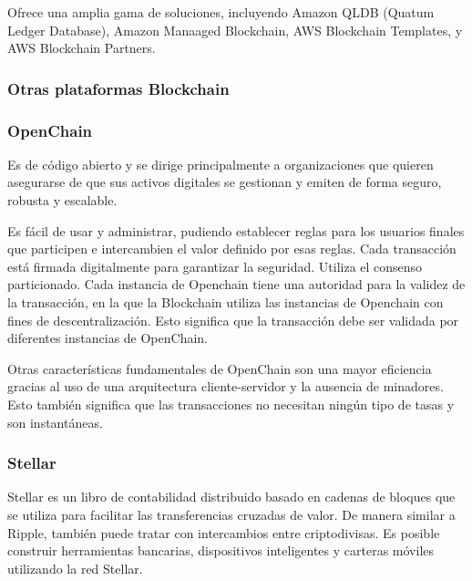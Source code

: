 \vspace{5mm}

\noindent Ofrece una amplia gama de soluciones, incluyendo Amazon QLDB (Quatum Ledger Database), Amazon Manaaged 
Blockchain, AWS Blockchain Templates, y AWS Blockchain Partners.

\subsubsection{Otras plataformas Blockchain}

\subsubsection*{OpenChain}

Es de código abierto y se dirige principalmente a organizaciones que quieren asegurarse de que sus activos digitales
se gestionan y emiten de forma seguro, robusta y escalable.

\vspace{5mm}

\noindent Es fácil de usar y administrar, pudiendo establecer reglas para los usuarios finales que participen e 
intercambien el valor definido por esas reglas. Cada transacción está firmada digitalmente para garantizar la 
seguridad. Utiliza el consenso particionado. Cada instancia de Openchain tiene una autoridad para la validez de 
la transacción, en la que la Blockchain utiliza las instancias de Openchain con fines de descentralización. Esto 
significa que la transacción debe ser validada por diferentes instancias de OpenChain.

\vspace{5mm}

\noindent Otras características fundamentales de OpenChain son una mayor eficiencia gracias al uso de una arquitectura 
cliente-servidor y la ausencia de minadores. Esto también significa que las transacciones no necesitan ningún 
tipo de tasas y son instantáneas.

\subsubsection*{Stellar}

Stellar es un libro de contabilidad distribuido basado en cadenas de bloques que se utiliza para facilitar las 
transferencias cruzadas de valor. De manera similar a Ripple, también puede tratar con intercambios entre criptodivisas. 
Es posible construir herramientas bancarias, dispositivos inteligentes y carteras móviles utilizando la red Stellar.


